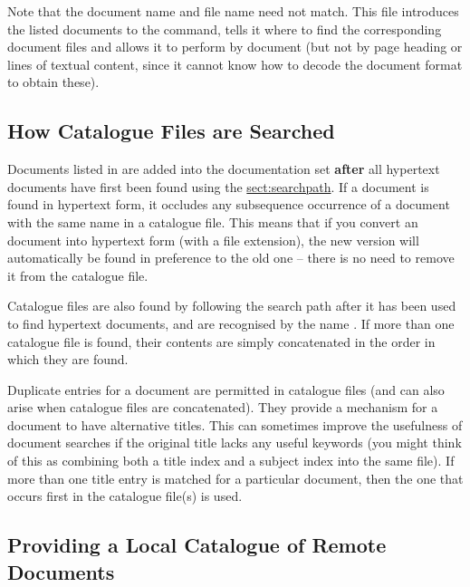 Note that the document name and file name need not match.  This file
introduces the listed documents to the  command, tells it
where to find the corresponding document files and allows it to
perform  by document
 (but not by page
heading or lines of textual content, since it cannot know how to
decode the document format to obtain these).

\subsection{How Catalogue Files are Searched}

Documents listed in   are added into the documentation set {\bf
after} all hypertext documents have first been found using the
\hyperref{\hi{HTX\_PATH} search path}{\hi{HTX\_PATH} search path (see
\S}{)}{sect:searchpath}.  If a document is found in hypertext form, it
occludes any subsequence occurrence of a document with the same name
in a catalogue file. This means that if you convert an 
document into hypertext form (with a  file extension), the
new version will automatically be found in preference to the old one
-- there is no need to remove it from the catalogue file.

Catalogue files are also found by following the  search
path after it has been used to find hypertext documents, and are
recognised by the name . If more than one catalogue
file is found, their contents are simply concatenated in the order in
which they are found.

Duplicate entries for a document are permitted in catalogue files (and
can also arise when catalogue files are concatenated). They provide a
mechanism for a document to have alternative titles. This can
sometimes improve the usefulness of document searches if the original
title lacks any useful keywords (you might think of this as combining
both a title index and a subject index into the same file).  If more
than one title entry is matched for a particular document, then the
one that occurs first in the catalogue file(s) is used.

\subsection{Providing a Local Catalogue of Remote Documents}

